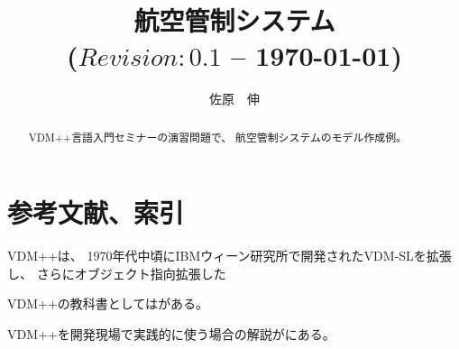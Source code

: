 \documentclass[a4paper,10pt]{jsarticle}
\begin{document}

\title{航空管制システム\\
\small{($Revision: 0.1 $ -- \today)}}
\author{佐原　伸\\
}
\date{\mbox{}}
\maketitle

\begin{abstract}
\setlength{\baselineskip}{12pt plus .1pt}
VDM++言語\cite{SCSK2012PP}入門セミナーの演習問題で、
航空管制システムのモデル作成例。
\end{abstract}

\tableofcontents





\newpage

\section{参考文献、索引}
VDM++\cite{SCSK2012PP}は、
1970年代中頃にIBMウィーン研究所で開発されたVDM-SL\cite{SCSK2012SL}を拡張し、
さらにオブジェクト指向拡張した


VDM++の教科書としては\cite{Sakoh2010}がある。

VDM++を開発現場で実践的に使う場合の解説が\cite{Sahara2008}にある。


%

%


\printindex
\end{document}
